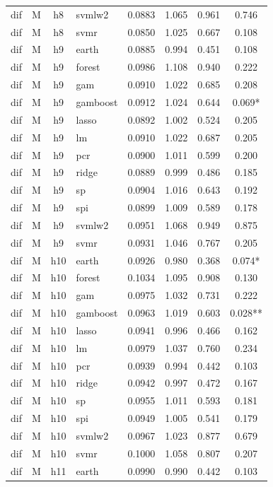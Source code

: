 \begin{ThreePartTable}
\begin{longtable}[t]{llclcccc}
dif & M & h8 & svmlw2 & 0.0883 & 1.065 & 0.961 & 0.746\\
dif & M & h8 & svmr & 0.0850 & 1.025 & 0.667 & 0.108\\
\addlinespace
dif & M & h9 & earth & 0.0885 & 0.994 & 0.451 & 0.108\\
dif & M & h9 & forest & 0.0986 & 1.108 & 0.940 & 0.222\\
dif & M & h9 & gam & 0.0910 & 1.022 & 0.685 & 0.208\\
dif & M & h9 & gamboost & 0.0912 & 1.024 & 0.644 & 0.069*\\
dif & M & h9 & lasso & 0.0892 & 1.002 & 0.524 & 0.205\\
dif & M & h9 & lm & 0.0910 & 1.022 & 0.687 & 0.205\\
dif & M & h9 & pcr & 0.0900 & 1.011 & 0.599 & 0.200\\
dif & M & h9 & ridge & 0.0889 & 0.999 & 0.486 & 0.185\\
dif & M & h9 & sp & 0.0904 & 1.016 & 0.643 & 0.192\\
dif & M & h9 & spi & 0.0899 & 1.009 & 0.589 & 0.178\\
dif & M & h9 & svmlw2 & 0.0951 & 1.068 & 0.949 & 0.875\\
dif & M & h9 & svmr & 0.0931 & 1.046 & 0.767 & 0.205\\
\addlinespace
dif & M & h10 & earth & 0.0926 & 0.980 & 0.368 & 0.074*\\
dif & M & h10 & forest & 0.1034 & 1.095 & 0.908 & 0.130\\
dif & M & h10 & gam & 0.0975 & 1.032 & 0.731 & 0.222\\
dif & M & h10 & gamboost & 0.0963 & 1.019 & 0.603 & 0.028**\\
dif & M & h10 & lasso & 0.0941 & 0.996 & 0.466 & 0.162\\
dif & M & h10 & lm & 0.0979 & 1.037 & 0.760 & 0.234\\
dif & M & h10 & pcr & 0.0939 & 0.994 & 0.442 & 0.103\\
dif & M & h10 & ridge & 0.0942 & 0.997 & 0.472 & 0.167\\
dif & M & h10 & sp & 0.0955 & 1.011 & 0.593 & 0.181\\
dif & M & h10 & spi & 0.0949 & 1.005 & 0.541 & 0.179\\
dif & M & h10 & svmlw2 & 0.0967 & 1.023 & 0.877 & 0.679\\
dif & M & h10 & svmr & 0.1000 & 1.058 & 0.807 & 0.207\\
\addlinespace
dif & M & h11 & earth & 0.0990 & 0.990 & 0.442 & 0.103\\

\end{longtable}
\end{ThreePartTable}
